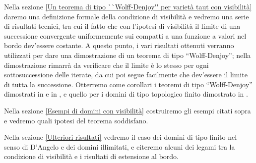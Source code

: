 Nella sezione \ref{Un teorema di tipo ``Wolff-Denjoy'' per varietà taut con visibilità} daremo una definizione formale della condizione di visibilità e vedremo una serie di risultati tecnici, tra cui il fatto che con l'ipotesi di visibilità il limite di una successione convergente uniformemente sui compatti a una funzione a valori nel bordo dev'essere costante. A questo punto, i vari risultati ottenuti verranno utilizzati per dare una dimostrazione di un teorema di tipo ``Wolff-Denjoy''; nella dimostrazione rimarrà da verificare che il limite è lo stesso per ogni sottosuccessione delle iterate, da cui poi segue facilmente che dev'essere il limite di tutta la successione. Otterremo come corollari i teoremi di tipo ``Wolff-Denjoy'' dimostrati in \cite{A2} e in \cite{CMS}, e quello per i domini di tipo topologico finito dimostrato in \cite{BM}.

Nella sezione \ref{Esempi di domini con visibilità} costruiremo gli esempi citati sopra e vedremo quali ipotesi del teorema soddisfano.

Nella sezione \ref{Ulteriori risultati} vedremo il caso dei domini di tipo finito nel senso di D'Angelo e dei domini illimitati, e citeremo alcuni dei legami tra la condizione di visibilità e i risultati di estensione al bordo.